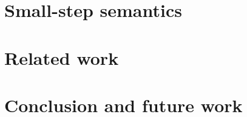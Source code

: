 \documentclass[preprint]{sigplanconf}
\newcommand{\many}{\overline}
\newcommand{\judgeword}[1]{~\mathbf{#1}~}
\newcommand{\sigentails}[1]{\mathbin{[{\text{\scriptsize ${#1}$}}]\!\text{-\!-}}\,}
\newcommand{\is}[4]  {#1 \sigentails{#2} {#3} \judgeword{is} {#4}}
\newcommand{\has}[4] {#1 \sigentails{#2} {#3} \judgeword{has} {#4}}
\newcommand{\does}[4]{#1 \sigentails{#2} {#3} \judgeword{does} {#4}}
\newcommand{\isgs}{\is{\Gamma}{\sigs}}
\newcommand{\hasgs}{\has{\Gamma}{\sigs}}
\newcommand{\doesgs}{\does{\Gamma}{\sigs}}
\newcommand{\sig}{S}
\newcommand{\sigs}{\Sigma}
\newcommand{\X}{X}  %
\newcommand{\U}{U}
\newcommand{\V}{V}
\newcommand{\Us}{\many{\U}}
\newcommand{\Vs}{\many{\V}}
\newcommand{\C}{C}
\newcommand{\tm}{t}
\newcommand{\tu}{u}
\newcommand{\tms}{\many{\tm}}
\newcommand{\h}{h}
\newcommand{\op}{\mathit{op}}
\newcommand{\effbox}[1]{[#1]}
\newcommand{\ret}[2]{\effbox{#1}{#2}}
\newcommand{\handleSymbol}{\mathbin{?}}
\newcommand{\handle}[2]{{#1} \handleSymbol {#2}}
\newcommand{\thunk}[1]{\{{#1}\}}
\newcommand{\force}[1]{{#1}!}
\newcommand{\con}{K}
\newcommand{\D}{D}
\begin{document}
\section{Small-step semantics}

\section{Related work}

\section{Conclusion and future work}










\end{document}
